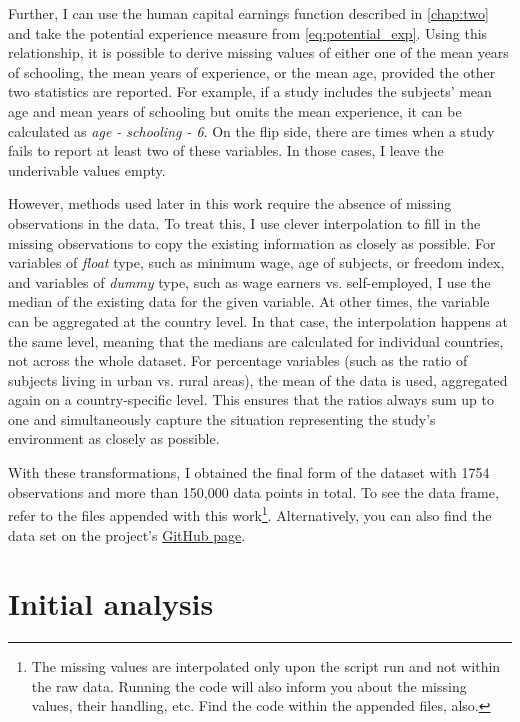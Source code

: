 Further, I can use the human capital earnings function described in \autoref{chap:two} and take the potential experience measure from \autoref{eq:potential_exp}. Using this relationship, it is possible to derive missing values of either one of the mean years of schooling, the mean years of experience, or the mean age, provided the other two statistics are reported. For example, if a study includes the subjects' mean age and mean years of schooling but omits the mean experience, it can be calculated as \textit{age - schooling - 6}. On the flip side, there are times when a study fails to report at least two of these variables. In those cases, I leave the underivable values empty.

However, methods used later in this work require the absence of missing observations in the data. To treat this, I use clever interpolation to fill in the missing observations to copy the existing information as closely as possible. For variables of \textit{float} type, such as minimum wage, age of subjects, or freedom index, and variables of \textit{dummy} type, such as wage earners vs. self-employed, I use the median of the existing data for the given variable. At other times, the variable can be aggregated at the country level. In that case, the interpolation happens at the same level, meaning that the medians are calculated for individual countries, not across the whole dataset. For percentage variables (such as the ratio of subjects living in urban vs. rural areas), the mean of the data is used, aggregated again on a country-specific level. This ensures that the ratios always sum up to one and simultaneously capture the situation representing the study's environment as closely as possible.

With these transformations, I obtained the final form of the dataset with 1754 observations and more than 150,000 data points in total. To see the data frame, refer to the files appended with this work\footnote{The missing values are interpolated only upon the script run and not within the raw data. Running the code will also inform you about the missing values, their handling, etc. Find the code within the appended files, also.}. Alternatively, you can also find the data set on the project's \href{https://github.com/PetrCala/Diploma-Thesis}{GitHub page}.

\section{Initial analysis}
\label{sec:initial_analysis}


